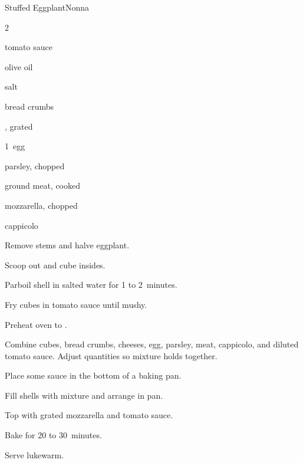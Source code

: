 \begin{recipe}{Stuffed Eggplant}{Nonna}{}

\begin{ingredients}
\item 2~
\item tomato sauce
\item olive oil
\item salt
\item bread crumbs
\item {}, grated
\item 1~egg
\item parsley, chopped
\item ground meat, cooked
\item mozzarella, chopped
\item cappicolo
\end{ingredients}

\begin{directions}
\item Remove stems and halve eggplant.
\item Scoop out and cube insides.
\item Parboil shell in salted water for 1 to 2~minutes.
\item Fry cubes in tomato sauce until mushy.
\item Preheat oven to .
\item Combine cubes, bread crumbs, cheeses, egg, parsley, meat, cappicolo, and diluted tomato sauce. Adjust quantities so mixture holds together.
\item Place some sauce in the bottom of a baking pan.
\item Fill shells with mixture and arrange in pan.
\item Top with grated mozzarella and tomato sauce.
\item Bake for 20 to 30~minutes.
\item Serve lukewarm.
\end{directions}

\hint{}
\end{recipe}
